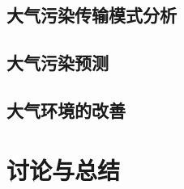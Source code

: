 \documentclass[UTF8]{ctexrep}
\begin{document}
    \subsection{大气污染传输模式分析}

    \subsection{大气污染预测}

    \subsection{大气环境的改善}

    \section{讨论与总结}
    
\end{document}
